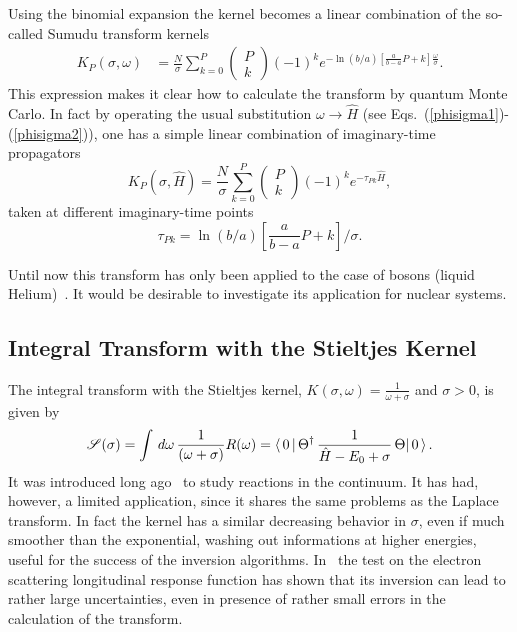 Using the binomial expansion the kernel becomes 
a linear combination of the so-called Sumudu transform kernels~\cite{Roggero_2013}
\begin{equation}
\label{nsum_kernel}
\begin{split}
K_P(\sigma,\omega)& =\frac{N}{\sigma} \sum^{P}_{k=0} {
\begin{pmatrix}
P\\
k
\end{pmatrix}
} (-1)^k e^{-\ln(b/a)[\frac{a}{b-a}P+k]\frac{\omega}{\sigma}}. 
\end{split}
\end{equation}
This expression makes it clear how to calculate the transform by  quantum Monte Carlo.   
In fact by operating the usual substitution $\omega \to \hat{H}$ (see Eqs.~(\ref{phisigma1})-(\ref{phisigma2})), one has  a simple 
linear combination of imaginary-time propagators 
\begin{equation}\label{deltalimit}
K_P(\sigma,\hat{H}) =\frac{N}{\sigma} \sum^{P}_{k=0} {
\begin{pmatrix}
P\\
k
\end{pmatrix}
} (-1)^k e^{-\tau_{Pk}\hat{H}},
\end{equation}
taken at different imaginary-time points
\begin{equation} 
\tau_{Pk}=\ln(b/a)[\frac{a}{b-a}P+k]/\sigma.
\end{equation}

Until now this transform has only been applied to the case of bosons (liquid Helium)~\cite{Roggero_2013}. It would be desirable
to investigate its  application for nuclear systems.


 
\subsection{Integral Transform  with the Stieltjes Kernel}\label{sec:STIELTJES}

The integral transform with the Stieltjes kernel, $K(\sigma,\omega)=\frac{1}{\omega+\sigma}$ and $\sigma>0$, is given by
\begin{equation}\label{Stieltjes}
 {\cal S}(\sigma)= \int\,d\omega \,\frac{1}{(\omega+\sigma)} R(\omega)=\langle\,0\,|\,\Theta^\dagger\, 
 \frac{1}{\hat H -E_0+\sigma}\,\Theta|\,0\,\rangle\,.
\end{equation}
It was introduced long ago~\cite{Efros85} to study reactions in the continuum. It has  
had, however, a limited application, since it shares the same problems as the Laplace transform. In fact  
the kernel has a similar decreasing behavior in $\sigma$, even if much smoother than the exponential, washing out informations at higher
energies, useful for the success of the inversion algorithms.
In~\cite{Stieltjes_1993} the test on the electron scattering  longitudinal response function has shown that its inversion
can lead to rather large uncertainties, even in presence of rather small errors in the calculation of the transform.

